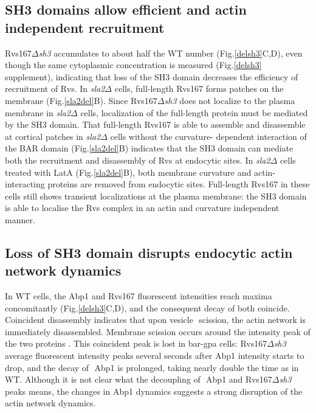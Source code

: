 \documentclass[9pt,lineno]{elife}
\begin{document}
\subsection{SH3 domains allow efficient and actin independent recruitment}

Rvs167\textit{$\Delta$sh3} accumulates to about half the WT number (Fig.\ref{delsh3}C,D), even though the same cytoplasmic concentration is measured (Fig.\ref{delsh3} supplement), indicating that loss of the SH3 domain decreases the efficiency of recruitment of Rvs. In \textit{sla2$\Delta$} cells, full-length Rvs167 forms patches on the membrane (Fig.\ref{sla2del}B). Since Rvs167\textit{$\Delta$sh3} does not localize to the plasma membrane in \textit{sla2$\Delta$} cells, localization of the full-length protein must be mediated by the SH3 domain. That full-length Rvs167 is able to assemble and disassemble at cortical patches in \textit{sla2$\Delta$} cells without the curvature- dependent interaction of the BAR domain (Fig.\ref{sla2del}B) indicates that the SH3 domain can mediate both the recruitment and disassembly of Rvs at endocytic sites. In \textit{sla2$\Delta$} cells treated with LatA (Fig.\ref{sla2del}B), both membrane curvature and actin-interacting proteins are removed from endocytic sites. Full-length Rvs167 in these cells still shows transient localizations at the plasma membrane: the SH3 domain is able to localise the Rvs complex in an actin and curvature independent manner.  

\subsection{Loss of SH3 domain disrupts endocytic actin network dynamics}
In WT cells, the Abp1 and Rvs167 fluorescent intensities reach maxima concomitantly (Fig.\ref{delsh3}C,D), and the consequent decay of both coincide. Coincident disassembly indicates that upon vesicle  scission, the actin network is immediately disassembled. Membrane scission occurs around the intensity peak of the two proteins \citep{Kukulski2012,Picco2015}. This coincident peak is lost in bar-gpa cells: Rvs167\textit{$\Delta$sh3} average fluorescent intensity peaks several seconds after Abp1 intensity starts to drop, and the decay of  Abp1 is prolonged, taking nearly double the time as in WT. Although it is not clear what the decoupling of  Abp1 and Rvs167\textit{$\Delta$sh3} peaks means, the changes in Abp1 dynamics suggests a strong disruption of the actin network dynamics.
\end{document}
